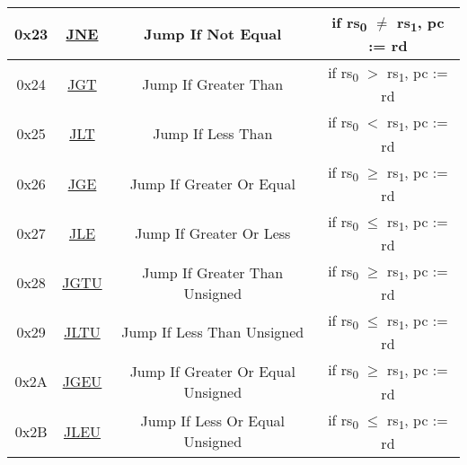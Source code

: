 \begin{center}
\begin{tabular}{|c|c|c|c|}
		\hline
		0x23 & \hyperref[sec:JNE]{JNE} & Jump If Not Equal & if rs\textsubscript{0} $\neq$ rs\textsubscript{1}, pc := rd\\
		\hline
		0x24 & \hyperref[sec:JGT]{JGT} & Jump If Greater Than & if rs\textsubscript{0} $>$ rs\textsubscript{1}, pc := rd\\
		\hline
		0x25 & \hyperref[sec:JLT]{JLT} & Jump If Less Than & if rs\textsubscript{0} $<$ rs\textsubscript{1}, pc := rd\\
		\hline
		0x26 & \hyperref[sec:JGE]{JGE} & Jump If Greater Or Equal & if rs\textsubscript{0} $\geq$ rs\textsubscript{1}, pc := rd\\
		\hline
		0x27 & \hyperref[sec:JLE]{JLE} & Jump If Greater Or Less & if rs\textsubscript{0} $\leq$ rs\textsubscript{1}, pc := rd\\
		\hline
		0x28 & \hyperref[sec:JGTU]{JGTU} & Jump If Greater Than Unsigned & if rs\textsubscript{0} $\geq$ rs\textsubscript{1}, pc := rd\\
		\hline
		0x29 & \hyperref[sec:JLTU]{JLTU} & Jump If Less Than Unsigned & if rs\textsubscript{0} $\leq$ rs\textsubscript{1}, pc := rd\\
		\hline
		0x2A & \hyperref[sec:JGEU]{JGEU} & Jump If Greater Or Equal Unsigned & if rs\textsubscript{0} $\geq$ rs\textsubscript{1}, pc := rd\\
		\hline
		0x2B & \hyperref[sec:JLEU]{JLEU} & Jump If Less Or Equal Unsigned & if rs\textsubscript{0} $\leq$ rs\textsubscript{1}, pc := rd\\
		\hline
	\end{tabular}
\end{center}